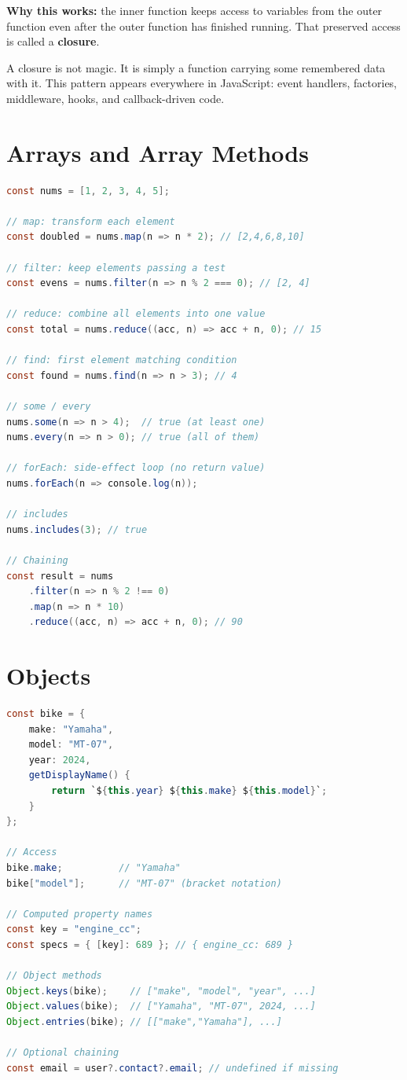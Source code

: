 \documentclass[12pt, a4paper, oneside]{book}
\begin{document}
\textbf{Why this works:} the inner function keeps access to variables from the outer function even after the outer function has finished running. That preserved access is called a \textbf{closure}.

\begin{intuitionbox}
A closure is not magic. It is simply a function carrying some remembered data with it. This pattern appears everywhere in JavaScript: event handlers, factories, middleware, hooks, and callback-driven code.
\end{intuitionbox}

\section{Arrays and Array Methods}

\begin{lstlisting}[language=Java, caption={Array methods}]
const nums = [1, 2, 3, 4, 5];

// map: transform each element
const doubled = nums.map(n => n * 2); // [2,4,6,8,10]

// filter: keep elements passing a test
const evens = nums.filter(n => n % 2 === 0); // [2, 4]

// reduce: combine all elements into one value
const total = nums.reduce((acc, n) => acc + n, 0); // 15

// find: first element matching condition
const found = nums.find(n => n > 3); // 4

// some / every
nums.some(n => n > 4);  // true (at least one)
nums.every(n => n > 0); // true (all of them)

// forEach: side-effect loop (no return value)
nums.forEach(n => console.log(n));

// includes
nums.includes(3); // true

// Chaining
const result = nums
    .filter(n => n % 2 !== 0)
    .map(n => n * 10)
    .reduce((acc, n) => acc + n, 0); // 90
\end{lstlisting}

\section{Objects}

\begin{lstlisting}[language=Java, caption={Objects in JavaScript}]
const bike = {
    make: "Yamaha",
    model: "MT-07",
    year: 2024,
    getDisplayName() {
        return `${this.year} ${this.make} ${this.model}`;
    }
};

// Access
bike.make;          // "Yamaha"
bike["model"];      // "MT-07" (bracket notation)

// Computed property names
const key = "engine_cc";
const specs = { [key]: 689 }; // { engine_cc: 689 }

// Object methods
Object.keys(bike);    // ["make", "model", "year", ...]
Object.values(bike);  // ["Yamaha", "MT-07", 2024, ...]
Object.entries(bike); // [["make","Yamaha"], ...]

// Optional chaining
const email = user?.contact?.email; // undefined if missing
\end{lstlisting}
\end{document}
